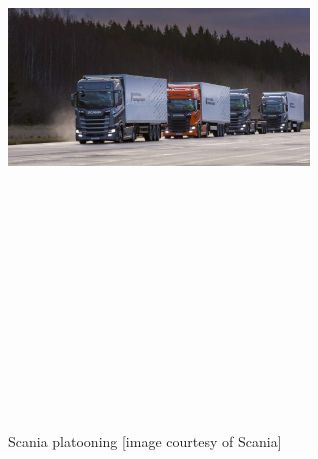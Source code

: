 \begin{figure}[!h]
        \centering 
        \includegraphics[width=8cm,height=18cm,keepaspectratio]{chapters/Chapitre_2/Figures/Scania_platooning.jpg}
        \caption{Scania platooning  [image courtesy of Scania]}
        \label{fig:Scania_platooning}
        \end{figure}


